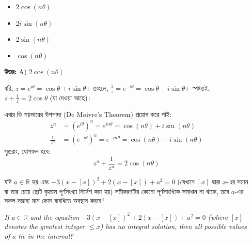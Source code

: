 \documentclass[12pt, a4paper]{article}
\begin{document}
\begin{itemize}[label={}, leftmargin=1cm, itemsep=0.5em]
    \item[\textbf{A)}] $2\cos(n\theta)$
    \item[\textbf{B)}] $2i\sin(n\theta)$
    \item[\textbf{C)}] $2\sin(n\theta)$
    \item[\textbf{D)}] $\cos(n\theta)$
\end{itemize}

\vspace{0.5em}
\begin{tcolorbox}[answerbox]
    \textbf{\color{success} উত্তর:} A) $2\cos(n\theta)$
\end{tcolorbox}
\vspace{1em}

\begin{tcolorbox}[solutionbox={সমাধান (Solution)}]
    \noindent
    ধরি, $z = e^{i\theta} = \cos\theta + i\sin\theta$। তাহলে, $\frac{1}{z} = e^{-i\theta} = \cos\theta - i\sin\theta$। স্পষ্টতই, $z + \frac{1}{z} = 2\cos\theta$ (যা দেওয়া আছে)। 
    
    \vspace{0.5em}
    এবার ডি ময়ভারের উপপাদ্য (De Moivre's Theorem) প্রয়োগ করে পাই:
    \begin{align*}
        z^n &= (e^{i\theta})^n = e^{in\theta} = \cos(n\theta) + i\sin(n\theta) \\
        \frac{1}{z^n} &= (e^{-i\theta})^n = e^{-in\theta} = \cos(n\theta) - i\sin(n\theta)
    \end{align*}
    সুতরাং, যোগফল হবে:
    \[ z^n + \frac{1}{z^n} = 2\cos(n\theta) \]
\end{tcolorbox}

\begin{tcolorbox}[questionbox={প্রশ্ন (Question) 26}]
    \noindent
    যদি $a \in \mathbb{R}$ হয় এবং $-3(x-[x])^2 + 2(x-[x]) + a^2 = 0$ (যেখানে $[x]$ দ্বারা $x$-এর সমান বা তার চেয়ে ছোট বৃহত্তম পূর্ণসংখ্যা নির্দেশ করা হয়) সমীকরণটির কোনো পূর্ণসাংখ্যিক সমাধান না থাকে, তবে $a$-এর সকল সম্ভাব্য মান কোন ব্যবধিতে অবস্থান করবে?
    
    \vspace{0.8em}
    \begin{english}
    \noindent\textit{\color{darkgray}
    If $a \in \mathbb{R}$ and the equation $-3(x-[x])^2 + 2(x-[x]) + a^2 = 0$ (where $[x]$ denotes the greatest integer $\le x$) has no integral solution, then all possible values of $a$ lie in the interval?
    }
    \end{english}
\end{tcolorbox}
\end{document}
